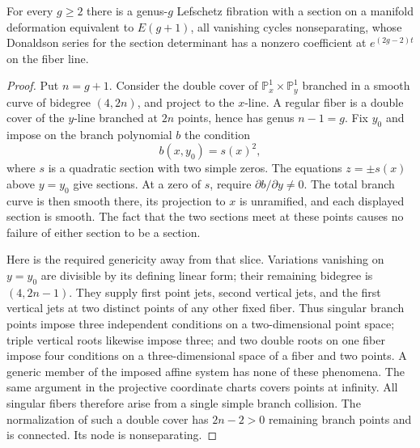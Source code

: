 \begin{lemma}\label{lem:caps:model}
For every $g\ge2$ there is a genus-$g$ Lefschetz fibration with a section
on a manifold deformation equivalent to $E(g+1)$, all vanishing cycles
nonseparating, whose Donaldson series for the section determinant has a
nonzero coefficient at $e^{(2g-2)t}$ on the fiber line.
\end{lemma}

\begin{proof}
Put $n=g+1$.  Consider the double cover of
$\mathbb P^1_x\times\mathbb P^1_y$ branched in a smooth curve of
bidegree $(4,2n)$, and project to the $x$-line.  A regular fiber is a
double cover of the $y$-line branched at $2n$ points, hence has genus
$n-1=g$.  Fix $y_0$ and impose on the branch polynomial $b$ the condition
\[
                         b(x,y_0)=s(x)^2,
\]
where $s$ is a quadratic section with two simple zeros.  The equations
$z=\pm s(x)$ above $y=y_0$ give sections.  At a zero of $s$, require
$\partial b/\partial y\ne0$.  The total branch curve is then smooth
there, its projection to $x$ is unramified, and each displayed section is
smooth.  The fact that the two sections meet at these points causes no
failure of either section to be a section.

Here is the required genericity away from that slice.  Variations
vanishing on $y=y_0$ are divisible by its defining linear form; their
remaining bidegree is $(4,2n-1)$.  They supply first point jets, second
vertical jets, and the first vertical jets at two distinct points of any
other fixed fiber.  Thus singular branch points impose three independent
conditions on a two-dimensional point space; triple vertical roots
likewise impose three; and two double roots on one fiber impose four
conditions on a three-dimensional space of a fiber and two points.
A generic member of the imposed affine system has none of these
phenomena.  The same argument in the projective coordinate charts covers
points at infinity.  All singular fibers therefore arise from a single
simple branch collision.  The normalization of such a double cover has
$2n-2>0$ remaining branch points and is connected.  Its node is
nonseparating.


\end{proof}
